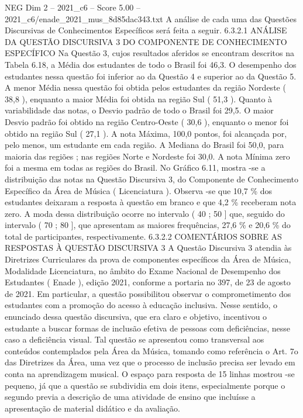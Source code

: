 \begin{textsample}{NEG Dim 2 – 2021\_c6 – Score 5.00 – 2021\_c6/enade\_2021\_mus\_8d85dac343.txt}
A análise de cada uma das Questões Discursivas de Conhecimentos Específicos será feita a seguir. 6.3.2.1 ANÁLISE DA QUESTÃO DISCURSIVA 3 DO COMPONENTE DE CONHECIMENTO ESPECÍFICO Na Questão 3, cujos resultados aferidos se encontram descritos na Tabela 6.18, a Média dos estudantes de todo o Brasil foi 46,3.
O desempenho dos estudantes nessa questão foi inferior ao da Questão 4 e superior ao da Questão 5.
A menor Média nessa questão foi obtida pelos estudantes da região Nordeste ( 38,8 ), enquanto a maior Média foi obtida na região Sul ( 51,3 ).
Quanto à variabilidade das notas, o Desvio padrão de todo o Brasil foi 29,5.
O maior Desvio padrão foi obtido na região Centro-Oeste ( 30,6 ), enquanto o menor foi obtido na região Sul ( 27,1 ).
A nota Máxima, 100,0 pontos, foi alcançada por, pelo menos, um estudante em cada região.
A Mediana do Brasil foi 50,0, para maioria das regiões ; nas regiões Norte e Nordeste foi 30,0.
A nota Mínima zero foi a mesma em todas as regiões do Brasil.
No Gráfico 6.11, mostra -se a distribuição das notas na Questão Discursiva 3, do Componente de Conhecimento Específico da Área de Música ( Licenciatura ).
Observa -se que 10,7 \% dos estudantes deixaram a resposta à questão em branco e que 4,2 \% receberam nota zero.
A moda dessa distribuição ocorre no intervalo ( 40 ; 50 ] que, seguido do intervalo ( 70 ; 80 ], que apresentam as maiores frequências, 27,6 \% e 20,6 \% do total de participantes, respectivamente. 6.3.2.2 COMENTÁRIOS SOBRE AS RESPOSTAS À QUESTÃO DISCURSIVA 3 A Questão Discursiva 3 atendia às Diretrizes Curriculares da prova de componentes específicos da Área de Música, Modalidade Licenciatura, no âmbito do Exame Nacional de Desempenho dos Estudantes ( Enade ), edição 2021, conforme a portaria no 397, de 23 de agosto de 2021.
Em particular, a questão possibilitou observar o comprometimento dos estudantes com a promoção do acesso à educação inclusiva.
Nesse sentido, o enunciado dessa questão discursiva, que era claro e objetivo, incentivou o estudante a buscar formas de inclusão efetiva de pessoas com deficiências, nesse caso a deficiência visual.
Tal questão se apresentou como transversal aos conteúdos contemplados pela Área da Música, tomando como referência o Art. 7o das Diretrizes da Área, uma vez que o processo de inclusão precisa ser levado em conta na aprendizagem musical.
O espaço para resposta de 15 linhas mostrou -se pequeno, já que a questão se subdividia em dois itens, especialmente porque o segundo previa a descrição de uma atividade de ensino que incluísse a apresentação de material didático e da avaliação.

\end{textsample}
